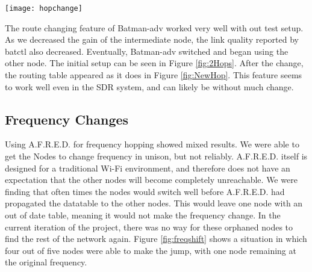 \begin{figure*}
	\centering
	\texttt{[image: hopchange]}
	\caption{After the gain is reduced, the packets are now routing through a different node.}
	\label{fig:NewHop}
\end{figure*}

The route changing feature of Batman-adv worked very well with out test setup. As we decreased the gain of the intermediate node, the link quality reported by batctl also decreased. Eventually, Batman-adv switched and began using the other node. The initial setup can be seen in Figure \ref{fig:2Hops}. After the change, the routing table appeared as it does in Figure \ref{fig:NewHop}. This feature seems to work well even in the SDR system, and can likely be without much change.  

\subsection{Frequency Changes}

Using A.F.R.E.D. for frequency hopping showed mixed results. We were able to get the Nodes to change frequency in unison, but not reliably. A.F.R.E.D. itself is designed for a traditional Wi-Fi environment, and therefore does not have an expectation that the other nodes will become completely unreachable. We were finding that often times the nodes would switch well before A.F.R.E.D. had propagated the datatable to the other nodes. This would leave one node with an out of date table, meaning it would not make the frequency change. In the current iteration of the project, there was no way for these orphaned nodes to find the rest of the network again. Figure \ref{fig:freqshift} shows a situation in which four out of five nodes were able to make the jump, with one node remaining at the original frequency.



